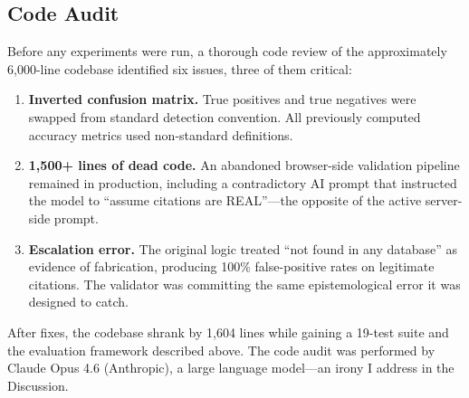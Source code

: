 \subsection{Code Audit}
Before any experiments were run, a thorough code review of the approximately 6{,}000-line codebase identified six issues, three of them critical:
\vspace{-0.5em}
\begin{enumerate}[itemsep=0.1em]
  \item \textbf{Inverted confusion matrix.} True positives and true negatives were swapped from standard detection convention. All previously computed accuracy metrics used non-standard definitions.
  \item \textbf{1{,}500+ lines of dead code.} An abandoned browser-side validation pipeline remained in production, including a contradictory AI prompt that instructed the model to ``assume citations are REAL''---the opposite of the active server-side prompt.
  \item \textbf{Escalation error.} The original logic treated ``not found in any database'' as evidence of fabrication, producing 100\% false-positive rates on legitimate citations. The validator was committing the same epistemological error it was designed to catch.
\end{enumerate}

After fixes, the codebase shrank by 1{,}604 lines while gaining a 19-test suite and the evaluation framework described above. The code audit was performed by Claude Opus 4.6 (Anthropic), a large language model---an irony I address in the Discussion.
